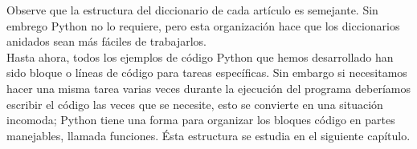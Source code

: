 Observe que la estructura del diccionario de cada artículo es semejante.  Sin embrego Python no lo requiere, pero esta organización hace que los diccionarios anidados sean más fáciles de trabajarlos.\\



Hasta ahora, todos los ejemplos de código Python que hemos desarrollado han sido bloque o líneas de código para tareas específicas. Sin embargo si necesitamos hacer una misma tarea varias veces durante la ejecución del programa deberíamos escribir el código las veces que se necesite, esto se convierte en  una situación incomoda; Python  tiene  una  forma para organizar los bloques código en partes manejables, llamada funciones. Ésta estructura se estudia en el siguiente capítulo.



